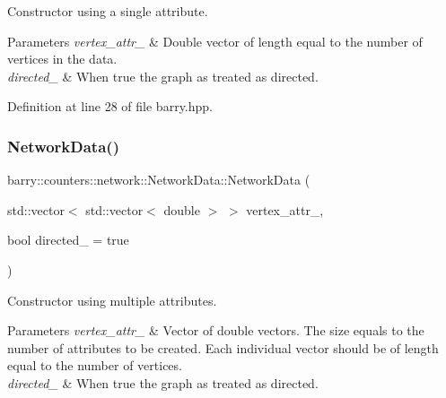 Constructor using a single attribute. 


\begin{DoxyParams}{Parameters}
{\em vertex\+\_\+attr\+\_\+} & Double vector of length equal to the number of vertices in the data. \\
\hline
{\em directed\+\_\+} & When {\ttfamily true} the graph as treated as directed. \\
\hline
\end{DoxyParams}


Definition at line 28 of file barry.\+hpp.

\mbox{\label{classbarry_1_1counters_1_1network_1_1_network_data_ac37270f77de515f8a60a18b75a5bb60d}} 
\subsubsection{\texorpdfstring{Network\+Data()}{NetworkData()}\hspace{0.1cm}{\footnotesize\ttfamily [3/3]}}
{\footnotesize\ttfamily barry\+::counters\+::network\+::\+Network\+Data\+::\+Network\+Data (\begin{DoxyParamCaption}\item[{std\+::vector$<$ std\+::vector$<$ double $>$ $>$}]{vertex\+\_\+attr\+\_\+,  }\item[{bool}]{directed\+\_\+ = {\ttfamily true} }\end{DoxyParamCaption})\hspace{0.3cm}{\ttfamily [inline]}}



Constructor using multiple attributes. 


\begin{DoxyParams}{Parameters}
{\em vertex\+\_\+attr\+\_\+} & Vector of double vectors. The size equals to the number of attributes to be created. Each individual vector should be of length equal to the number of vertices. \\
\hline
{\em directed\+\_\+} & When {\ttfamily true} the graph as treated as directed. \\
\hline
\end{DoxyParams}


